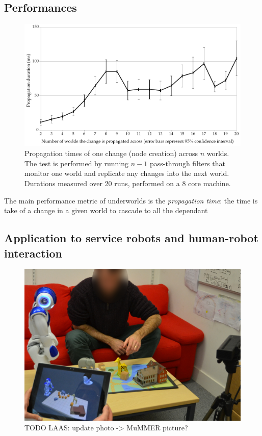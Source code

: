 \documentclass[letterpaper, 10pt, conference]{ieeeconf}
\newcommand{\uwds}{{\sc underworlds}\xspace}
\begin{document}
\subsection{Performances}
\label{performances}

\begin{figure}
    \centering
    \includegraphics[width=\linewidth]{performances}
    \caption{Propagation times of one change (node creation)
    across $n$ worlds. The test is performed by running $n-1$ pass-through
    filters that monitor one world and replicate
    any changes into the next world. Durations measured over 20 runs, performed on
    a 8 core machine.}
    \label{fig|performances}
\end{figure}

The main performance metric of \uwds is the \emph{propagation time}: the time is
take of a change in a given world to cascade to all the dependant 

\subsection{Application to service robots and human-robot interaction}

\begin{figure}
    \centering
    \includegraphics[width=\linewidth]{l2tor-photo2-blind}
    \caption{TODO LAAS: update photo -> MuMMER picture?}
    \label{fig|mummer-example}
\end{figure}
\end{document}
